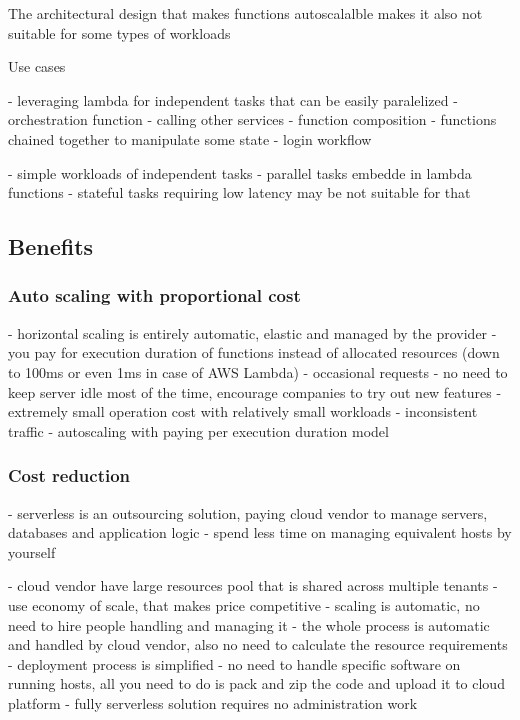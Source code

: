 The architectural design that makes functions autoscalalble makes it also not suitable for some types of workloads

Use cases

- leveraging lambda for independent tasks that can be easily paralelized
- orchestration function - calling other services
- function composition - functions chained together to manipulate some state - login workflow

- simple workloads of independent tasks - parallel tasks embedde in lambda functions
- stateful tasks requiring low latency may be not suitable for that

\subsection{Benefits} 

\subsubsection*{Auto scaling with proportional cost}

- horizontal scaling is entirely automatic, elastic and managed by the provider
- you pay for execution duration of functions instead of allocated resources (down to 100ms or even 1ms in case of AWS Lambda)
- occasional requests - no need to keep server idle most of the time, encourage companies to try out new features - extremely small operation cost with relatively small workloads
- inconsistent traffic - autoscaling with paying per execution duration model

\subsubsection*{Cost reduction} 


- serverless is an outsourcing solution, paying cloud vendor to manage servers, databases and application logic
- spend less time on managing equivalent hosts by yourself

- cloud vendor have large resources pool that is shared across multiple tenants - use economy of scale, that makes price competitive
- scaling is automatic, no need to hire people handling and managing it - the whole process is automatic and handled by cloud vendor, also no need to calculate the resource requirements
- deployment process is simplified - no need to handle specific software on running hosts, all you need to do is pack and zip the code and upload it to cloud platform
- fully serverless solution requires no administration work

